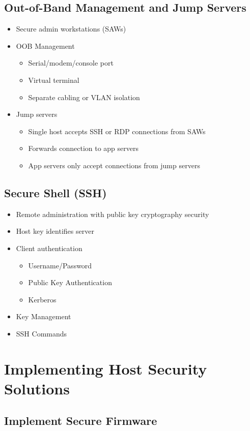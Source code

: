 	\subsection {Out-of-Band Management and Jump Servers}
		\begin{itemize}
			\item Secure admin workstations (SAWs)
			\item OOB Management
				\begin{itemize}
					\item Serial/modem/console port
					\item Virtual terminal
					\item Separate cabling or VLAN isolation
				\end{itemize}
			\item Jump servers
				\begin{itemize}
					\item Single host accepts SSH or RDP connections from SAWs
					\item Forwards connection to app servers
					\item App servers only accept connections from jump servers
				\end{itemize}
		\end{itemize}
	\subsection {Secure Shell (SSH)}
		\begin{itemize}
			\item Remote administration with public key cryptography security
			\item Host key identifies server
			\item Client authentication
				\begin{itemize}
					\item Username/Password
					\item Public Key Authentication
					\item Kerberos
				\end{itemize}
			\item Key Management
			\item SSH Commands
		\end{itemize}

\section {Implementing Host Security Solutions}
	\subsection {Implement Secure Firmware}
